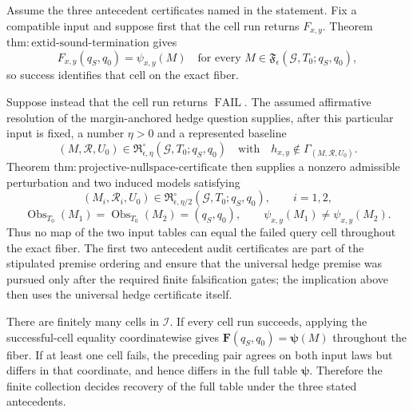 Assume the three antecedent certificates named in the statement.  Fix a compatible input and suppose first that the cell run returns \(F_{x,y}\).  Theorem \(\mathrm{thm{:}extid\text{-}sound\text{-}termination}\) gives
\[
 F_{x,y}(q_S,q_0)=\psi_{x,y}(M)
 \quad\text{for every }M\in\mathfrak F_{\epsilon}(\mathcal G,T_0;q_S,q_0),
\]
so success identifies that cell on the exact fiber.

Suppose instead that the cell run returns \(\operatorname{FAIL}\).  The assumed affirmative resolution of the margin-anchored hedge question supplies, after this particular input is fixed, a number \(\eta>0\) and a represented baseline
\[
 (M,\mathcal R,U_0)
 \in\mathfrak R_{\epsilon,\eta}^{\circ}(\mathcal G,T_0;q_S,q_0)
 \quad\text{with}\quad
 h_{x,y}\notin\Gamma_{(M,\mathcal R,U_0)}.
\]
Theorem \(\mathrm{thm{:}projective\text{-}nullspace\text{-}certificate}\) then supplies a nonzero admissible perturbation and two induced models satisfying
\[
 (M_i,\mathcal R_i,U_0)
 \in\mathfrak R_{\epsilon,\eta/2}^{\circ}(\mathcal G,T_0;q_S,q_0),
 \qquad i=1,2,
\]
\[
 \operatorname{Obs}_{T_0}(M_1)
 =\operatorname{Obs}_{T_0}(M_2)=(q_S,q_0),
 \qquad
 \psi_{x,y}(M_1)\neq\psi_{x,y}(M_2).
\]
Thus no map of the two input tables can equal the failed query cell throughout the exact fiber.  The first two antecedent audit certificates are part of the stipulated premise ordering and ensure that the universal hedge premise was pursued only after the required finite falsification gates; the implication above then uses the universal hedge certificate itself.

There are finitely many cells in \(\mathcal I\).  If every cell run succeeds, applying the successful-cell equality coordinatewise gives \(\mathbf F(q_S,q_0)=\boldsymbol\psi(M)\) throughout the fiber.  If at least one cell fails, the preceding pair agrees on both input laws but differs in that coordinate, and hence differs in the full table \(\boldsymbol\psi\).  Therefore the finite collection decides recovery of the full table under the three stated antecedents.